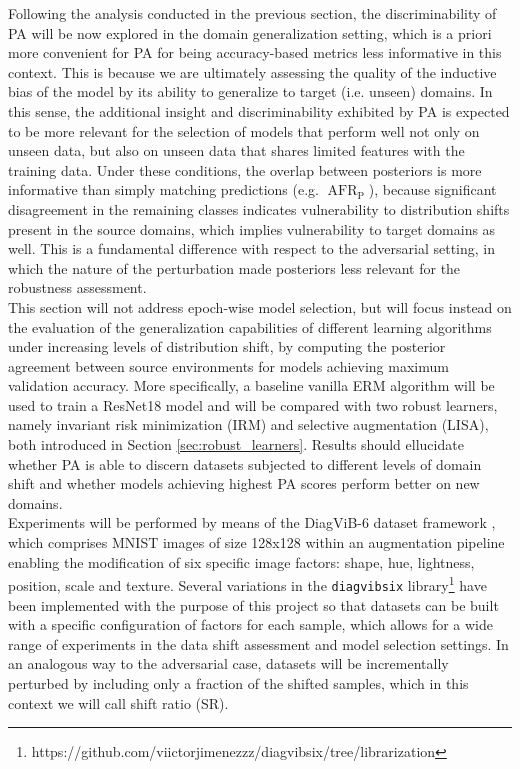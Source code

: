 Following the analysis conducted in the previous section, the discriminability of PA
will be now explored in the domain generalization setting, which is a priori more convenient
for PA for being accuracy-based metrics less informative in this context. This is because
we are ultimately assessing the quality of the inductive bias of the model
by its ability to generalize to target (i.e. unseen) domains. In this sense, the additional
insight and discriminability exhibited by PA is expected to be more relevant for the selection of
models that perform well not only on unseen data, but also on unseen data that shares limited 
features with the training data. Under these conditions, the overlap between posteriors is more
informative than simply matching predictions (e.g. $\operatorname{AFR}_{\text{P}}$), because 
significant disagreement in
the remaining classes indicates vulnerability to distribution shifts present in
the source domains, which implies vulnerability to target domains as well. This is
a fundamental difference with respect to the adversarial setting, in which the nature of the
perturbation made posteriors less relevant for the robustness assessment.\\

This section will not address epoch-wise model selection, but will focus instead on 
the evaluation of the generalization capabilities of different learning algorithms under increasing 
levels of distribution shift, by computing the posterior agreement between source environments for 
models achieving maximum validation accuracy. More specifically, a baseline vanilla ERM algorithm will be 
used to train a ResNet18 model and will be compared with two robust 
learners, namely invariant risk minimization (IRM) and selective
augmentation (LISA), both introduced in Section \ref{sec:robust_learners}. Results should
ellucidate whether PA is able to discern datasets subjected to different levels of domain shift and
whether models achieving highest PA scores perform better on new domains. \\

Experiments will be performed by means of the DiagViB-6 dataset
framework
\cite{euligDiagViB6DiagnosticBenchmark2021}, 
which comprises MNIST images of size 128x128 within an augmentation pipeline enabling
the modification of six specific image factors: shape, hue, lightness, position,
scale and texture. Several variations in the \texttt{diagvibsix}
library\footnote{https://github.com/viictorjimenezzz/diagvibsix/tree/librarization}
have been implemented with the purpose 
of this project so that datasets can be built with a specific configuration of factors for each sample, which 
allows for a wide range of experiments in the data shift assessment and model selection settings. In
an analogous way to the adversarial case, datasets will be incrementally perturbed by including only
a fraction of the shifted samples, which in this context we will call shift ratio (SR).\\


